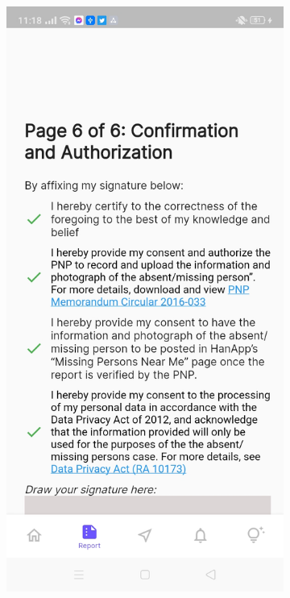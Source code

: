 \begin{figure}[!h]
    \centering
    \begin{subfigure}[c]{0.40\linewidth}
        \centering
        \includegraphics[scale=0.15]{figures/Chapter4/Main/p6-1.jpg}

\end{subfigure}
\end{figure}
